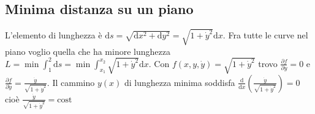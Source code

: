 \documentclass[10pt,a4paper]{article}
\newcommand{\de}{\mathrm d}
\newcommand{\fracd}[2]{\frac{\de #1}{\de #2}}
\newcommand{\fracp}[2]{\frac{\partial #1}{\partial #2}}
\begin{document}
	\subsection{Minima distanza su un piano}
	L'elemento di lunghezza è $\de s=\sqrt{\de x^2+\de y^2}=\sqrt{1+\dot y^2}\de x$. Fra tutte le curve nel piano voglio quella che ha minore lunghezza $L=\min \int_1^2 \de s = \min \int_{x_1}^{x_2}\sqrt{1+\dot y^2}\de x$. Con $f(x,y,\dot y)=\sqrt{1+\dot y^2}$ trovo $\fracp{f}{y}=0$ e $\fracp{f}{\dot y}=\frac{\dot y}{\sqrt{1+\dot y^2}}$. Il cammino $y(x)$ di lunghezza minima soddisfa $\fracd{}{x}(\frac{\dot y}{\sqrt{1+\dot y^2}})=0$ cioè $\frac{\dot y}{\sqrt{1+\dot y^2}}=\text{cost}$
	
\end{document}
